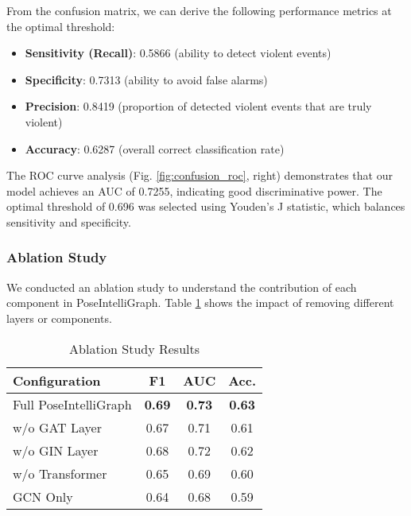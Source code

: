\documentclass[conference]{IEEEtran}
\begin{document}
From the confusion matrix, we can derive the following performance metrics at
the optimal threshold:
\begin{itemize}
    \item \textbf{Sensitivity (Recall)}: 0.5866 (ability to detect violent events)
    \item \textbf{Specificity}: 0.7313 (ability to avoid false alarms)
    \item \textbf{Precision}: 0.8419 (proportion of detected violent events that are truly violent)
    \item \textbf{Accuracy}: 0.6287 (overall correct classification rate)
\end{itemize}

The ROC curve analysis (Fig. \ref{fig:confusion_roc}, right) demonstrates that
our model achieves an AUC of 0.7255, indicating good discriminative power. The
optimal threshold of 0.696 was selected using Youden's J statistic, which
balances sensitivity and specificity.

\subsubsection{Ablation Study}
We conducted an ablation study to understand the contribution of each component
in PoseIntelliGraph. Table \ref{tab:ablation} shows the impact of removing
different layers or components.

\begin{table}[htbp]
    \caption{Ablation Study Results}
    \begin{center}
        \renewcommand{\arraystretch}{1.2}
        \begin{tabular}{|l|c|c|c|}
            \hline
            \rowcolor[gray]{0.9}
            \textbf{Configuration} & \textbf{F1}   & \textbf{AUC}  & \textbf{Acc.} \\
            \hline
            Full PoseIntelliGraph  & \textbf{0.69} & \textbf{0.73} & \textbf{0.63} \\
            \hline
            w/o GAT Layer          & 0.67          & 0.71          & 0.61          \\
            \hline
            w/o GIN Layer          & 0.68          & 0.72          & 0.62          \\
            \hline
            w/o Transformer        & 0.65          & 0.69          & 0.60          \\
            \hline
            GCN Only               & 0.64          & 0.68          & 0.59          \\
            \hline
        \end{tabular}
    \end{center}
    \label{tab:ablation}
\end{table}
\end{document}
